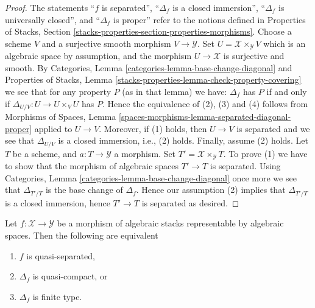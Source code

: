 \begin{proof}
The statements
``$f$ is separated'',
``$\Delta_f$ is a closed immersion'',
``$\Delta_f$ is universally closed'', and
``$\Delta_f$ is proper''
refer to the notions defined in
Properties of Stacks,
Section \ref{stacks-properties-section-properties-morphisms}.
Choose a scheme $V$ and a surjective smooth morphism $V \to \mathcal{Y}$.
Set $U = \mathcal{X} \times_\mathcal{Y} V$ which is an algebraic
space by assumption, and the morphism $U \to \mathcal{X}$ is surjective
and smooth. By
Categories, Lemma \ref{categories-lemma-base-change-diagonal}
and
Properties of Stacks,
Lemma \ref{stacks-properties-lemma-check-property-covering}
we see that for any property $P$ (as in that lemma) we have:
$\Delta_f$ has $P$ if and only if $\Delta_{U/V} : U \to  U \times_V U$ has $P$.
Hence the equivalence of (2), (3) and (4) follows from
Morphisms of Spaces,
Lemma \ref{spaces-morphisms-lemma-separated-diagonal-proper}
applied to $U \to V$.
Moreover, if (1) holds, then $U \to V$ is separated and we see that
$\Delta_{U/V}$ is a closed immersion, i.e., (2) holds.
Finally, assume (2) holds. Let $T$ be a scheme, and $a : T \to \mathcal{Y}$
a morphism. Set $T' = \mathcal{X} \times_\mathcal{Y} T$. To prove
(1) we have to show that the morphism of algebraic spaces $T' \to T$
is separated. Using
Categories, Lemma \ref{categories-lemma-base-change-diagonal}
once more we see that $\Delta_{T'/T}$ is the base change of
$\Delta_f$. Hence our assumption (2) implies that $\Delta_{T'/T}$
is a closed immersion, hence $T' \to T$ is separated as desired.
\end{proof}

\begin{lemma}
\label{lemma-representable-quasi-separated-diagonal-quasi-compact}
Let $f : \mathcal{X} \to \mathcal{Y}$ be a morphism of algebraic stacks
representable by algebraic spaces. Then the following are equivalent
\begin{enumerate}
\item $f$ is quasi-separated,
\item $\Delta_f$ is quasi-compact, or
\item $\Delta_f$ is finite type.
\end{enumerate}
\end{lemma}

